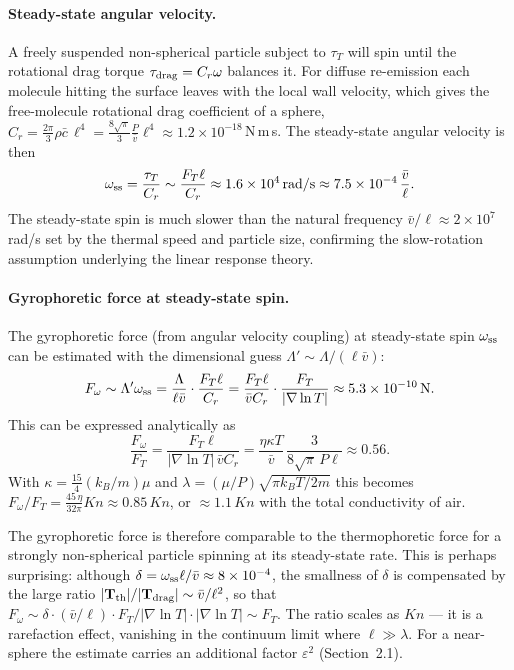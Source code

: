 \documentclass[11pt]{article}
\newcommand{\chg}[1]{\marginpar{\raggedright\footnotesize\textcolor{red!70!black}{\textsf{#1}}}}
\begin{document}
\paragraph{Steady-state angular velocity.}\chg{C19} A freely suspended non-spherical particle subject to $\tau_T$ will spin until the rotational drag torque $\tau_{\rm drag}=C_r\omega$ balances it. For diffuse re-emission each molecule hitting the surface leaves with the local wall velocity, which gives the free-molecule rotational drag coefficient of a sphere, $C_r=\frac{2\pi}{3}\rho\bar c\,\ell^4=\frac{8\sqrt\pi}{3}\frac{P}{\bar v}\ell^4\approx1.2\times10^{-18}\,$N\,m\,s. The steady-state angular velocity is then
\begin{equation}
  \omega_{\rm ss}=\frac{\tau_T}{C_r}\sim\frac{F_T\ell}{C_r}\approx1.6\times10^4\,\mathrm{rad/s}\approx7.5\times10^{-4}\,\frac{\bar v}{\ell}.
\end{equation}
The steady-state spin is much slower than the natural frequency $\bar v/\ell\approx2\times10^7\,$rad/s set by the thermal speed and particle size, confirming the slow-rotation assumption underlying the linear response theory.

\paragraph{Gyrophoretic force at steady-state spin.} The gyrophoretic force (from angular velocity coupling) at steady-state spin $\omega_{\rm ss}$ can be estimated with the dimensional guess $\Lambda'\sim\Lambda/(\ell\bar v)$:
\begin{equation}
  F_\omega\sim\Lambda'\omega_{\rm ss}=\frac{\Lambda}{\ell\bar v}\cdot\frac{F_T\ell}{C_r}=\frac{F_T\ell}{\bar vC_r}\cdot\frac{F_T}{|\nabla\ln T|}\approx5.3\times10^{-10}\,\mathrm N .
\end{equation}
This can be expressed analytically as\chg{C19}
\begin{equation}
  \frac{F_\omega}{F_T}=\frac{F_T\ell}{|\nabla\ln T|\,\bar vC_r}=\frac{\eta\kappa T}{\bar v}\,\frac{3}{8\sqrt\pi\,P\ell}\approx0.56 .
\end{equation}
With $\kappa=\frac{15}{4}(k_B/m)\mu$ and $\lambda=(\mu/P)\sqrt{\pi k_BT/2m}$ this becomes $F_\omega/F_T=\frac{45\,\eta}{32\pi}Kn\approx0.85\,Kn$, or $\approx1.1\,Kn$ with the total conductivity of air.

The gyrophoretic force is therefore comparable to the thermophoretic force for a strongly non-spherical particle spinning at its steady-state rate. This is perhaps surprising: although $\delta=\omega_{\rm ss}\ell/\bar v\approx8\times10^{-4}$, the smallness of $\delta$ is compensated by the large ratio $|\mathbf T_{\rm th}|/|\mathbf T_{\rm drag}|\sim\bar v/\ell^2$, so that $F_\omega\sim\delta\cdot(\bar v/\ell)\cdot F_T/|\nabla\ln T|\cdot|\nabla\ln T|\sim F_T$. The ratio scales as $Kn$ --- it is a rarefaction effect, vanishing in the continuum limit where $\ell\gg\lambda$. For a near-sphere the estimate carries an additional factor $\varepsilon^2$ (Section~2.1).\chg{C10}
\end{document}
